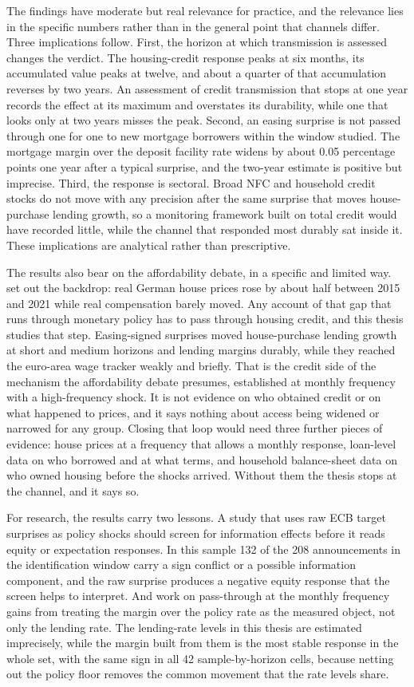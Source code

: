 The findings have moderate but real relevance for practice, and the relevance lies in the specific numbers rather than in the general point that channels differ. Three implications follow. First, the horizon at which transmission is assessed changes the verdict. The housing-credit response peaks at six months, its accumulated value peaks at twelve, and about a quarter of that accumulation reverses by two years. An assessment of credit transmission that stops at one year records the effect at its maximum and overstates its durability, while one that looks only at two years misses the peak. Second, an easing surprise is not passed through one for one to new mortgage borrowers within the window studied. The mortgage margin over the deposit facility rate widens by about 0.05 percentage points one year after a typical surprise, and the two-year estimate is positive but imprecise. Third, the response is sectoral. Broad NFC and household credit stocks do not move with any precision after the same surprise that moves house-purchase lending growth, so a monitoring framework built on total credit would have recorded little, while the channel that responded most durably sat inside it. These implications are analytical rather than prescriptive.

The results also bear on the affordability debate, in a specific and limited way.  set out the backdrop: real German house prices rose by about half between 2015 and 2021 while real compensation barely moved. Any account of that gap that runs through monetary policy has to pass through housing credit, and this thesis studies that step. Easing-signed surprises moved house-purchase lending growth at short and medium horizons and lending margins durably, while they reached the euro-area wage tracker weakly and briefly. That is the credit side of the mechanism the affordability debate presumes, established at monthly frequency with a high-frequency shock. It is not evidence on who obtained credit or on what happened to prices, and it says nothing about access being widened or narrowed for any group. Closing that loop would need three further pieces of evidence: house prices at a frequency that allows a monthly response, loan-level data on who borrowed and at what terms, and household balance-sheet data on who owned housing before the shocks arrived. Without them the thesis stops at the channel, and it says so.

For research, the results carry two lessons. A study that uses raw ECB target surprises as policy shocks should screen for information effects before it reads equity or expectation responses. In this sample 132 of the 208 announcements in the identification window carry a sign conflict or a possible information component, and the raw surprise produces a negative equity response that the screen helps to interpret. And work on pass-through at the monthly frequency gains from treating the margin over the policy rate as the measured object, not only the lending rate. The lending-rate levels in this thesis are estimated imprecisely, while the margin built from them is the most stable response in the whole set, with the same sign in all 42 sample-by-horizon cells, because netting out the policy floor removes the common movement that the rate levels share.

